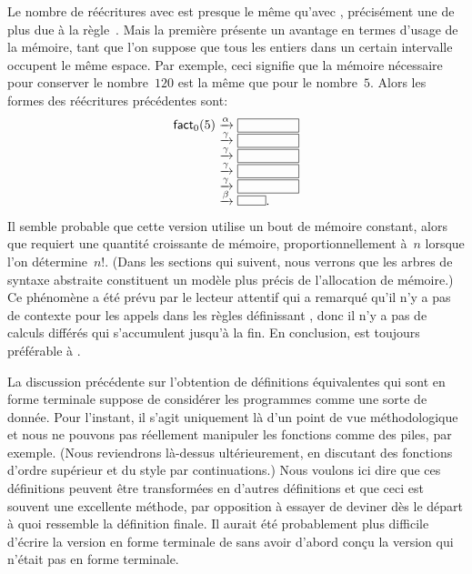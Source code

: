 Le nombre de réécritures avec  est presque le même
qu'avec , précisément une de plus due à la
règle~\clause{\alpha}. Mais la première présente un avantage en termes
d'usage de la mémoire, tant que l'on suppose que tous les entiers dans
un certain intervalle occupent le même espace. Par exemple, ceci
signifie que la mémoire nécessaire pour conserver le nombre~\(120\)
est la même que pour le nombre~\(5\). Alors les formes des réécritures
précédentes sont:
\begin{equation*}
\setlength\fboxsep{0mm}
\begin{array}{r@{\;}c@{\;}l}
\fun{fact}_0(5)
& \xrightarrow{\smash[t]{\alpha}} &
\fbox{\phantom{$\fun{fact}_0(0,10)$}}\\
& \xrightarrow{\smash[t]{\gamma}} &
\fbox{\phantom{$\fun{fact}_0(0,10)$}}\\
& \xrightarrow{\smash[t]{\gamma}} &
\fbox{\phantom{$\fun{fact}_0(0,10)$}}\\
& \xrightarrow{\smash[t]{\gamma}} &
\fbox{\phantom{$\fun{fact}_0(0,10)$}}\\
& \xrightarrow{\smash[t]{\gamma}} &
\fbox{\phantom{$\fun{fact}_0(0,10)$}}\\
& \xrightarrow{\smash[t]{\beta}} & \fbox{\phantom{CCC}}.
\end{array}
\end{equation*}
Il semble probable que cette version utilise un bout de mémoire
constant, alors que  requiert une quantité croissante de
mémoire, proportionnellement à~\(n\) lorsque l'on
détermine~\(n!\). (Dans les sections qui suivent, nous verrons que les
arbres de syntaxe abstraite constituent un modèle plus précis de
l'allocation de mémoire.) Ce phénomène a été prévu par le lecteur
attentif qui a remarqué qu'il n'y a pas de contexte pour les appels
dans les règles définissant , donc il n'y a pas de
calculs différés qui s'accumulent jusqu'à la fin. En conclusion,
 est toujours préférable à .

La discussion précédente sur l'obtention de définitions équivalentes
qui sont en forme terminale suppose de considérer les programmes comme
une sorte de donnée. Pour l'instant, il s'agit uniquement là d'un
point de vue méthodologique et nous ne pouvons pas réellement
manipuler les fonctions comme des piles, par exemple. (Nous
reviendrons là-dessus ultérieurement, en discutant des fonctions
d'ordre supérieur et du style par continuations.) Nous voulons ici
dire que ces définitions peuvent être transformées en d'autres
définitions et que ceci est souvent une excellente méthode, par
opposition à essayer de deviner dès le départ à quoi ressemble la
définition finale. Il aurait été probablement plus difficile d'écrire
la version en forme terminale de  sans avoir d'abord conçu
la version qui n'était pas en forme terminale.

